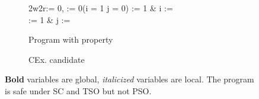 \begin{figure}[H]
\centering
\begin{subfigure}{0.5\columnwidth}
        \centering
            \begin{litmus}{2}{2w2r}{\x := 0, \y := 0}{\neg (i = 1 \land j = 0)}
                \x := 1 & i := \y\\
                \y := 1 & j := \x
            \end{litmus}
            \captionsetup{labelformat=empty}
            \caption{Program with property}
            \label{fig:example_program}
\end{subfigure}%
\begin{subfigure}{0.5\columnwidth}
            \centering
            \begin{execgraph}{1.25}
                
                \begin{thread}
                \end{thread}
                \begin{thread}
                \end{thread}
                
                

                
            \end{execgraph}
            \captionsetup{labelformat=empty}
            \caption{CEx. candidate}
            \label{fig:example_candidate}

            
    \vspace{0.15cm}
            
\end{subfigure}
\captionsetup{labelformat=empty}
\caption{\textbf{Bold} variables are global, \emph{italicized} variables are local. The program is safe under SC and TSO but not PSO.}
\label{fig:example}
\end{figure}